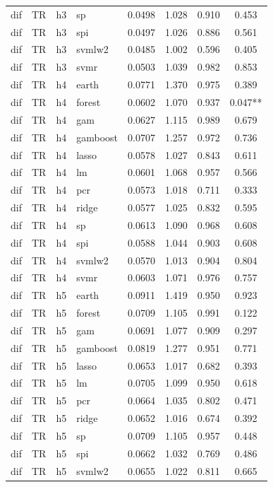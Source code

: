 \begin{ThreePartTable}
\begin{longtable}[t]{llclcccc}
dif & TR & h3 & sp & 0.0498 & 1.028 & 0.910 & 0.453\\
dif & TR & h3 & spi & 0.0497 & 1.026 & 0.886 & 0.561\\
dif & TR & h3 & svmlw2 & 0.0485 & 1.002 & 0.596 & 0.405\\
dif & TR & h3 & svmr & 0.0503 & 1.039 & 0.982 & 0.853\\
\addlinespace
dif & TR & h4 & earth & 0.0771 & 1.370 & 0.975 & 0.389\\
dif & TR & h4 & forest & 0.0602 & 1.070 & 0.937 & 0.047**\\
dif & TR & h4 & gam & 0.0627 & 1.115 & 0.989 & 0.679\\
dif & TR & h4 & gamboost & 0.0707 & 1.257 & 0.972 & 0.736\\
dif & TR & h4 & lasso & 0.0578 & 1.027 & 0.843 & 0.611\\
dif & TR & h4 & lm & 0.0601 & 1.068 & 0.957 & 0.566\\
dif & TR & h4 & pcr & 0.0573 & 1.018 & 0.711 & 0.333\\
dif & TR & h4 & ridge & 0.0577 & 1.025 & 0.832 & 0.595\\
dif & TR & h4 & sp & 0.0613 & 1.090 & 0.968 & 0.608\\
dif & TR & h4 & spi & 0.0588 & 1.044 & 0.903 & 0.608\\
dif & TR & h4 & svmlw2 & 0.0570 & 1.013 & 0.904 & 0.804\\
dif & TR & h4 & svmr & 0.0603 & 1.071 & 0.976 & 0.757\\
\addlinespace
dif & TR & h5 & earth & 0.0911 & 1.419 & 0.950 & 0.923\\
dif & TR & h5 & forest & 0.0709 & 1.105 & 0.991 & 0.122\\
dif & TR & h5 & gam & 0.0691 & 1.077 & 0.909 & 0.297\\
dif & TR & h5 & gamboost & 0.0819 & 1.277 & 0.951 & 0.771\\
dif & TR & h5 & lasso & 0.0653 & 1.017 & 0.682 & 0.393\\
dif & TR & h5 & lm & 0.0705 & 1.099 & 0.950 & 0.618\\
dif & TR & h5 & pcr & 0.0664 & 1.035 & 0.802 & 0.471\\
dif & TR & h5 & ridge & 0.0652 & 1.016 & 0.674 & 0.392\\
dif & TR & h5 & sp & 0.0709 & 1.105 & 0.957 & 0.448\\
dif & TR & h5 & spi & 0.0662 & 1.032 & 0.769 & 0.486\\
dif & TR & h5 & svmlw2 & 0.0655 & 1.022 & 0.811 & 0.665\\

\end{longtable}
\end{ThreePartTable}
